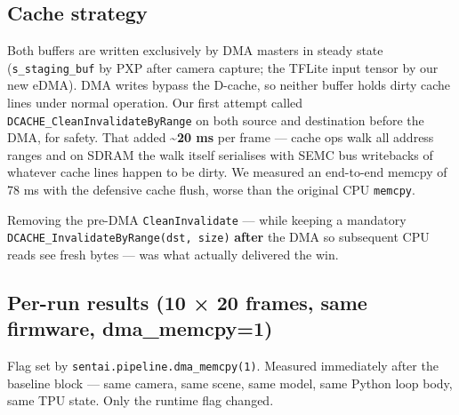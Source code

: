 \subsection{Cache strategy}\label{cache-strategy}

Both buffers are written exclusively by DMA masters in steady state
(\texttt{s\_staging\_buf} by PXP after camera capture; the TFLite input
tensor by our new eDMA). DMA writes bypass the D-cache, so neither
buffer holds dirty cache lines under normal operation. Our first attempt
called \texttt{DCACHE\_CleanInvalidateByRange} on both source and
destination before the DMA, for safety. That added
\textbf{\textasciitilde20 ms} per frame --- cache ops walk all address
ranges and on SDRAM the walk itself serialises with SEMC bus writebacks
of whatever cache lines happen to be dirty. We measured an end-to-end
memcpy of 78 ms with the defensive cache flush, worse than the original
CPU \texttt{memcpy}.

Removing the pre-DMA \texttt{CleanInvalidate} --- while keeping a
mandatory \texttt{DCACHE\_InvalidateByRange(dst,\ size)} \textbf{after}
the DMA so subsequent CPU reads see fresh bytes --- was what actually
delivered the win.

\subsection{Per-run results (10 × 20 frames, same firmware,
dma\_memcpy=1)}\label{per-run-results-10-20-frames-same-firmware-dma_memcpy1}

Flag set by \texttt{sentai.pipeline.dma\_memcpy(1)}. Measured
immediately after the baseline block --- same camera, same scene, same
model, same Python loop body, same TPU state. Only the runtime flag
changed.

